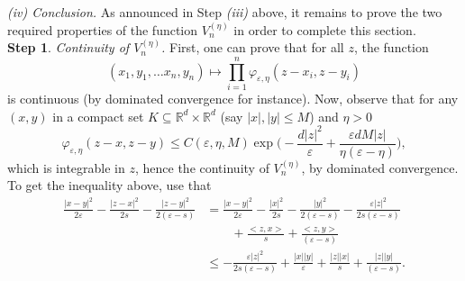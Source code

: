 \documentclass[a4paper,11pt]{amsart}
\numberwithin{equation}{section}
\newcommand{\bbR}{{\ensuremath{\mathbb R}} }
\newcommand{\gep}{\varepsilon}
\newcommand{\8}{\infty}
\newcommand{\beq}{\begin{equation}}
\newcommand{\eeq}{\end{equation}}
\newcommand{\ba}{\begin{aligned}}
\newcommand{\ea}{\end{aligned}}
\begin{document}
{\noindent \it (iv) Conclusion.}
As announced in Step {\it (iii)} above, it remains to prove the two required properties of the function $V_n^{(\eta)}$ in order to complete this section.\\
{\bf \noindent Step 1}. {\it Continuity of $V_n^{(\eta)}$.} First, one can prove that for all $z$, the function 
\beq
(x_1,y_1,\ldots x_n, y_n) \mapsto \prod_{i=1}^n \varphi_{\gep,\eta}(z-x_i,z-y_i)
\eeq
is continuous (by dominated convergence for instance). Now, observe that for any $(x,y)$ in a compact set $K\subseteq \bbR^d\times \bbR^d$ (say $|x|,|y|\le M$) and $\eta>0$
\beq
\varphi_{\gep,\eta}(z-x,z-y) \le C(\gep,\eta,M)
\exp\Big(-\frac{{d}|z|^2}{\gep}+ \frac{\gep{ d} M|z|}{\eta(\gep-\eta)}\Big),
\eeq
which is integrable in $z$, hence the continuity of $V_n^{(\eta)}$, by dominated convergence. To get the inequality above, use that
\beq
\ba
\frac{|x-y|^2}{2\gep} - \frac{|z-x|^2}{2s} - \frac{|z-y|^2}{2(\gep-s)} &= 
\frac{|x-y|^2}{2\gep} - \frac{|x|^2}{2s} - \frac{|y|^2}{2(\gep-s)} - \frac{\gep|z|^2}{2s(\gep-s)}\\
&\qquad + \frac{<z,x>}{s} + \frac{<z,y>}{(\gep-s)}\\
& \le - \frac{\gep|z|^2}{2s(\gep-s)} + \frac{|x||y|}{\gep}+ \frac{|z||x|}{s} + \frac{|z||y|}{(\gep-s)}.
\ea
\eeq
%
\end{document}
